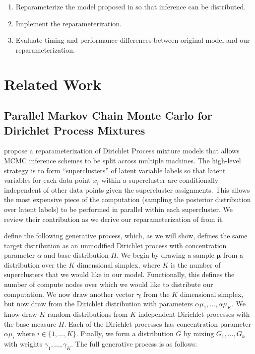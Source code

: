 \documentclass{article}
\begin{document}
\begin{enumerate}[1.]
\item Reparameterize the model proposed in \cite{goldwater2011} so
  that inference can be distributed.
\item Implement the reparameterization.
\item Evaluate timing and performance differences between original
  model and our reparameterization.
\end{enumerate}

\section{Related Work}
\label{sec:related-work}

\subsection{Parallel Markov Chain Monte Carlo for Dirichlet Process Mixtures}
\label{sec:parallel-mcmc-for-dpm}

\cite{lovell2012} propose a reparameterization of Dirichlet Process
mixture models that allows MCMC inference schemes to be split across
multiple machines. The high-level strategy is to form
``superclusters'' of latent variable labels so that latent variables
for each data point $x_i$ within a supercluster are conditionally
independent of other data points given the supercluster
assignments. This allows the most expensive piece of the computation
(sampling the posterior distribution over latent labels) to be
performed in parallel within each supercluster. We review their
contribution as we derive our reparameterization of
\cite{goldwater2011} from it.

\cite{lovell2012} define the following generative process, which, as
we will show, defines the same target distribution as an unmodified
Dirichlet process with concentration parameter $\alpha$ and base
distribution $H$. We begin by drawing a sample $\boldsymbol{\mu}$ from
a distribution over the $K$ dimensional simplex, where $K$ is the
number of superclusters that we would like in our model. Functionally,
this defines the number of compute nodes over which we would like to
distribute our computation. We now draw another vector
$\boldsymbol{\gamma}$ from the $K$ dimensional simplex, but now draw
from the Dirichlet distribution with parameters $\alpha \mu_1, \ldots,
\alpha \mu_K$. We know draw $K$ random distributions from $K$
independent Dirichlet processes with the base measure $H$. Each of the
Dirichlet processes has concentration parameter $\alpha \mu_i$ where
$i \in \{1, \ldots, K\}$. Finally, we form a distribution $G$ by
mixing $G_1, \ldots, G_k$ with weights $\gamma_1, \ldots,
\gamma_K$. The full generative process is as follows:
\end{document}
